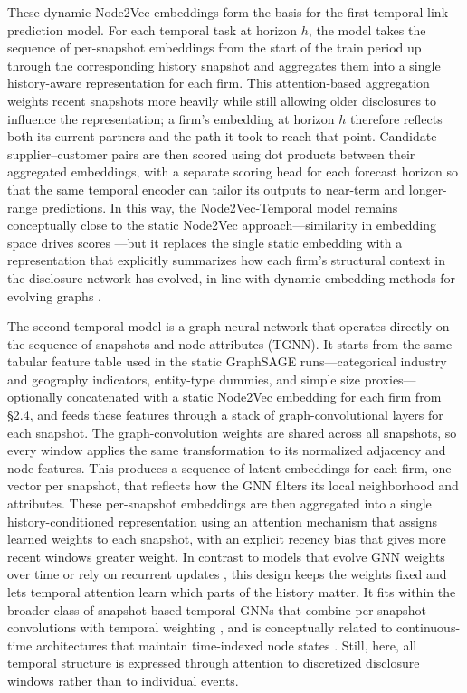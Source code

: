These dynamic Node2Vec embeddings form the basis for the first temporal link-prediction model. For each temporal task at horizon \(h\), the model takes the sequence of per-snapshot embeddings from the start of the train period up through the corresponding history snapshot and aggregates them into a single history-aware representation for each firm. This attention-based aggregation weights recent snapshots more heavily while still allowing older disclosures to influence the representation; a firm's embedding at horizon \(h\) therefore reflects both its current partners and the path it took to reach that point. Candidate supplier--customer pairs are then scored using dot products between their aggregated embeddings, with a separate scoring head for each forecast horizon so that the same temporal encoder can tailor its outputs to near-term and longer-range predictions. In this way, the Node2Vec-Temporal model remains conceptually close to the static Node2Vec approach---similarity in embedding space drives scores \parencite{grover_node2vec_2016}---but it replaces the single static embedding with a representation that explicitly summarizes how each firm's structural context in the disclosure network has evolved, in line with dynamic embedding methods for evolving graphs \parencite{goyal_dyngraph2vec_2020}.

The second temporal model is a graph neural network that operates directly on the sequence of snapshots and node attributes (TGNN). It starts from the same tabular feature table used in the static GraphSAGE runs---categorical industry and geography indicators, entity-type dummies, and simple size proxies---optionally concatenated with a static Node2Vec embedding for each firm from \S2.4, and feeds these features through a stack of graph-convolutional layers for each snapshot. The graph-convolution weights are shared across all snapshots, so every window applies the same transformation to its normalized adjacency and node features. This produces a sequence of latent embeddings for each firm, one vector per snapshot, that reflects how the GNN filters its local neighborhood and attributes. These per-snapshot embeddings are then aggregated into a single history-conditioned representation using an attention mechanism that assigns learned weights to each snapshot, with an explicit recency bias that gives more recent windows greater weight.
In contrast to models that evolve GNN weights over time or rely on recurrent updates \parencite{pareja_evolvegcn_2020}, this design keeps the weights fixed and lets temporal attention learn which parts of the history matter. It fits within the broader class of snapshot-based temporal GNNs that combine per-snapshot convolutions with temporal weighting \parencite{sankar_dysat_2020}, and is conceptually related to continuous-time architectures that maintain time-indexed node states \parencite{rossi_temporal_2020,xu_inductive_2020}. Still, here, all temporal structure is expressed through attention to discretized disclosure windows rather than to individual events.

